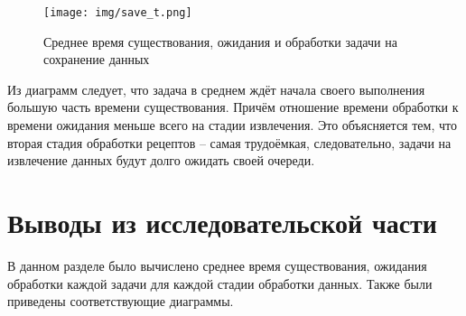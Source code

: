 \begin{figure}[H]
	\centering
	\texttt{[image: img/save\_t.png]}
	\caption{Среднее время существования, ожидания и обработки задачи на сохранение данных}
	\label{fig:save}
\end{figure}

Из диаграмм следует, что задача в среднем ждёт начала своего выполнения большую часть времени существования.
Причём отношение времени обработки к времени ожидания меньше всего на стадии извлечения.
Это объясняется тем, что вторая стадия обработки рецептов -- самая трудоёмкая, следовательно, задачи на извлечение данных будут долго ожидать своей очереди.

\section{Выводы из исследовательской части}
В данном разделе было вычислено среднее время существования, ожидания  обработки каждой задачи для каждой стадии обработки данных.
Также были приведены соответствующие диаграммы.